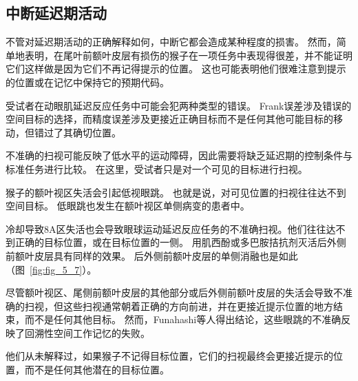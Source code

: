\subsection{中断延迟期活动}

不管对延迟期活动的正确解释如何，中断它都会造成某种程度的损害。
然而，简单地表明，在尾叶前额叶皮层有损伤的猴子在一项任务中表现得很差，并不能证明它们这样做是因为它们不再记得提示的位置。
这也可能表明他们很难注意到提示的位置或在记忆中保持它的预期代码。


受试者在动眼肌延迟反应任务中可能会犯两种类型的错误。
Frank误差涉及错误的空间目标的选择\cite{keller2008effect}，而精度误差涉及更接近正确目标而不是任何其他可能目标的移动，但错过了其确切位置。


不准确的扫视可能反映了低水平的运动障碍，因此需要将缺乏延迟期的控制条件与标准任务进行比较。
在这里，受试者只是对一个可见的目标进行扫视。


猴子的额叶视区失活会引起低视眼跳。
也就是说，对可见位置的扫视往往达不到空间目标\cite{dias1999muscimol}。
低眼跳也发生在额叶视区单侧病变的患者中\cite{gaymard1999frontal,ploner1999errors}。


冷却导致8A区失活也会导致眼球运动延迟反应任务的不准确扫视。他们往往达不到正确的目标位置，或在目标位置的一侧\cite{chafee2000inactivation}。
用肌西酚\cite{sawaguchi2001prefrontal}或多巴胺拮抗剂\cite{sawaguchi1991d1}灭活后外侧前额叶皮层具有同样的效果。
后外侧前额叶皮层的单侧消融也是如此\cite{funahashi1993dorsolateral}（图~\ref{fig:fig_5_7}）。


尽管额叶视区、尾侧前额叶皮层的其他部分或后外侧前额叶皮层的失活会导致不准确的扫视，但这些扫视通常朝着正确的方向前进，并在更接近提示位置的地方结束，而不是任何其他目标。
然而，Funahashi等人\cite{funahashi1993dorsolateral}得出结论，这些眼跳的不准确反映了回溯性空间工作记忆的失败。


他们从未解释过，如果猴子不记得目标位置，它们的扫视最终会更接近提示的位置，而不是任何其他潜在的目标位置。


